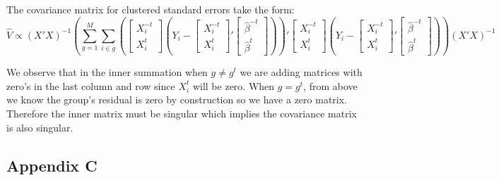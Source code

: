 \documentclass[12pt]{article}
\begin{document}
The covariance matrix for clustered standard errors take the form:
$$ \hat{V} \propto (X'X)^{-1} \left( \sum_{g=1}^{M} \sum_{i \in g} \left(\begin{bmatrix}
X_i^{-t} \\  X_i^t 
\end{bmatrix}(Y_i - \begin{bmatrix}
X_i^{-t} \\  X_i^t 
\end{bmatrix}' \begin{bmatrix}
\hat{\beta}^{-t} \\ \hat{\beta}^t 
\end{bmatrix})\right)' \begin{bmatrix}
X_i^{-t} \\  X_i^t 
\end{bmatrix}(Y_i - \begin{bmatrix}
X_i^{-t} \\  X_i^t 
\end{bmatrix}' \begin{bmatrix}
\hat{\beta}^{-t} \\ \hat{\beta}^t 
\end{bmatrix})  \right)  (X'X)^{-1}$$ 

We observe that in the inner summation when $g \ne g^t$ we are adding matrices with zero's in the last column and row since $X^t_i$ will be zero. When $g = g^t$, from above we know the group's residual is zero by construction so we have a zero matrix. Therefore the inner matrix must be singular which implies the covariance matrix is also singular. 

\subsection*{Appendix C}
\end{document}
